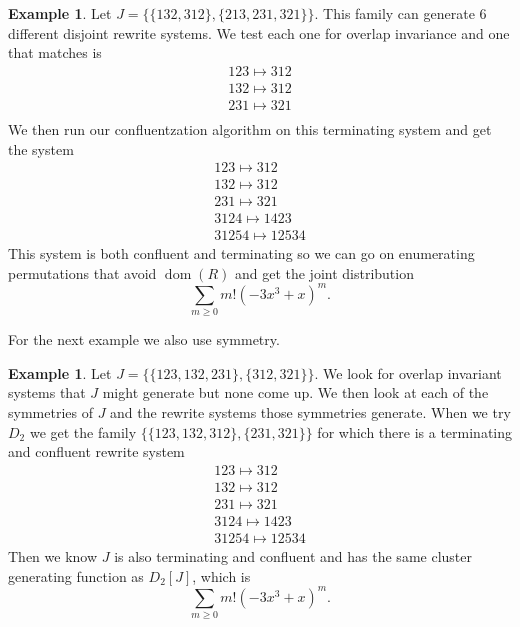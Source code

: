 \documentclass[a4paper, 11pt, english]{article}
\newcommand{\patternrule}{ \mapsto \!}
\theoremstyle{definition}
\newtheorem{example}[theorem]{Example}
\DeclareMathOperator{\dom}{dom}
\begin{document}
\begin{example}
Let $J=\{\{ 132, 312 \}, \{ 213, 231, 321 \}\}$. This family can generate 6
different disjoint rewrite systems. We test each one for overlap invariance and one that
matches is 
\[
    \begin{matrix}
        123 \patternrule 312 \\
        132 \patternrule 312 \\
        231 \patternrule 321 \\
    \end{matrix}
\]
We then run our confluentzation algorithm on this terminating system
and get the system
\[
    \begin{matrix}
        123 \patternrule 312 \\
        132 \patternrule 312 \\
        231 \patternrule 321 \\
        3124 \patternrule 1423 \\
        31254 \patternrule 12534
    \end{matrix}
\]
This system is both confluent and terminating so we can go on enumerating
permutations that avoid $\dom(R)$ and get the joint distribution
\[
  \sum_{m \geq 0} m! (-3x^3 + x)^m.
\]
 
\end{example}

For the next example we also use symmetry.

\begin{example}
Let $J = \{\{123, 132, 231\}, \{312, 321\}\}$. We look for overlap invariant systems that $J$ might
generate but none come up. We then look at each of the symmetries of $J$ and the rewrite systems
those symmetries generate. When we try $D_2$ we get the family $\{ \{ 123, 132, 312 \}, \{ 231, 321
\} \}$ for which there is a terminating and confluent rewrite system
\[
    \begin{matrix}
        123 \patternrule 312 \\
        132 \patternrule 312 \\
        231 \patternrule 321 \\
        3124 \patternrule 1423 \\
        31254 \patternrule 12534
    \end{matrix}
\]
Then we know $J$ is also terminating and confluent and has the same cluster generating function as
$D_2[J]$, which is
\[
  \sum_{m \geq 0} m! (-3x^3 + x)^m.
\]

\end{example}
\end{document}

